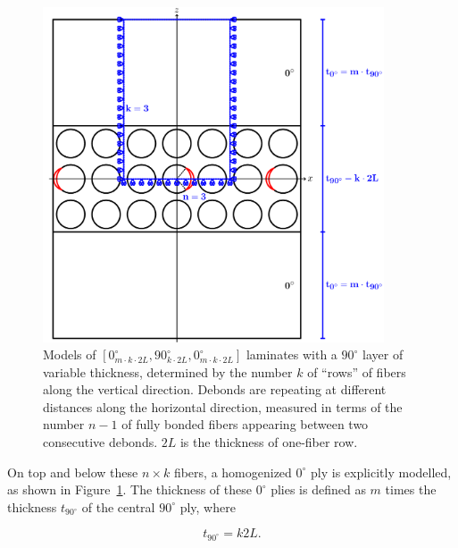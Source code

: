 \begin{figure}[!htb]
\centering
        \includegraphics[width=0.9\textwidth]{paperC/ThickPly.pdf}
\caption{Models of $\left[0_{m\cdot k\cdot2L}^{\circ},90_{k\cdot2L}^{\circ},0_{m\cdot k\cdot2L}^{\circ}\right]$ laminates with a $90^{\circ}$ layer of variable thickness, determined by the number $k$ of ``rows'' of fibers along the vertical direction.  Debonds are repeating at different distances along the horizontal direction, measured in terms of the number $n-1$ of fully bonded fibers appearing between two consecutive debonds. $2L$ is the thickness of one-fiber row.}\label{chap3:paperC:fig:laminateModelsB}
\end{figure}

On top and below these $n\times k$ fibers, a homogenized $0^{\circ}$ ply is explicitly modelled, as shown in Figure~\ref{chap3:paperC:fig:laminateModelsB}. The thickness of these $0^{\circ}$ plies is defined as $m$ times the thickness $t_{90^{\circ}}$ of the central $90^{\circ}$ ply, where

\begin{equation}\label{chap3:paperC:eq:90thickness}
t_{90^{\circ}}=k2L.
\end{equation}

